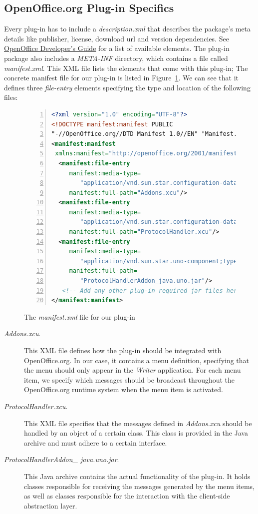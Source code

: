 \subsection{OpenOffice.org Plug-in Specifics}
Every plug-in has to include a \emph{description.xml} that describes the 
package's meta details like publisher, license, download url and version dependencies.
See \href{http://wiki.services.openoffice.org/wiki/Documentation/DevGuide/Extensions/Description_of_XML_Elements}{OpenOffice Developer's Guide}
for a list of available elements. The plug-in package also includes a
\emph{META-INF} directory, which contains a file called
\emph{manifest.xml}. This XML file lists the elements that come with
this plug-in;  The concrete manifest file for our plug-in is listed in
Figure~\ref{list:manifest}.  We can see that it defines three
\emph{file-entry} elements specifying the type and location of the
following files:
\begin{figure}[tb]
\centering
\begin{lstlisting}[language=XML,numbers=left,xleftmargin=8mm,columns=flexible]
<?xml version="1.0" encoding="UTF-8"?> 
<!DOCTYPE manifest:manifest PUBLIC 
"-//OpenOffice.org//DTD Manifest 1.0//EN" "Manifest.dtd"> 
<manifest:manifest 
 xmlns:manifest="http://openoffice.org/2001/manifest"> 
  <manifest:file-entry 
     manifest:media-type=
        "application/vnd.sun.star.configuration-data" 
     manifest:full-path="Addons.xcu"/> 
  <manifest:file-entry 
     manifest:media-type=
        "application/vnd.sun.star.configuration-data" 
     manifest:full-path="ProtocolHandler.xcu"/> 
  <manifest:file-entry 
     manifest:media-type=
        "application/vnd.sun.star.uno-component;type=Java" 
     manifest:full-path=
        "ProtocolHandlerAddon_java.uno.jar"/>
   <!-- Add any other plug-in required jar files here. -->
</manifest:manifest> 
\end{lstlisting}
\caption{The \emph{manifest.xml} file for our plug-in}
\label{list:manifest}
\end{figure}


\begin{description}
\item[\emph{Addons.xcu}.] This XML file defines how the plug-in should
  be integrated with OpenOffice.org. In our case, it contains a menu
  definition, specifying that the menu should only appear in the
  \emph{Writer} application. For each menu item, we specify which
  messages should be broadcast throughout the OpenOffice.org runtime
  system when the menu item is activated.
\item[\emph{ProtocolHandler.xcu}. ] This XML file specifies that the
  messages defined in \emph{Addons.xcu} should be handled by an object
  of a certain class. This class is provided in the Java archive and
  must adhere to a certain interface. 
\item[\emph{ProtocolHandlerAddon\_ java.uno.jar}.] This Java archive
  contains the actual functionality of the plug-in. It holds classes
  responsible for receiving the messages generated by the menu items,
  as well as classes responsible for the interaction with the
  client-side abstraction layer.
\end{description}


